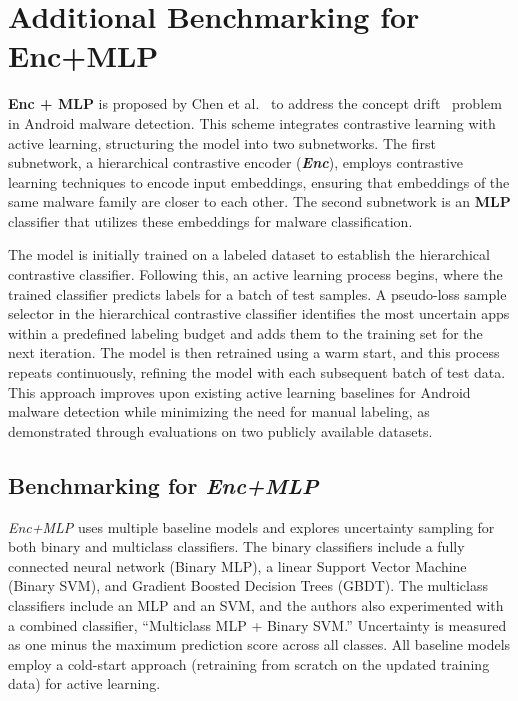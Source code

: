 \section{Additional Benchmarking for Enc+MLP}

\textbf{Enc + MLP} is %
proposed by Chen et al.~\cite{Chen:USENIX23} to address the
concept drift~\cite{Jordaney:USENIX17} problem in Android malware
detection. This scheme integrates contrastive learning with active
learning, structuring the model into two subnetworks. The first
subnetwork, a hierarchical contrastive encoder
(\textbf{\textit{Enc}}), employs contrastive learning techniques to
encode input embeddings, ensuring that embeddings of the same malware
family are closer to each other. The second subnetwork is an
\textbf{MLP} classifier that utilizes these embeddings for malware
classification.

The model is initially trained on a labeled dataset to establish the
hierarchical contrastive classifier. Following this, an active
learning process begins, where the trained classifier predicts labels
for a batch of test samples. A pseudo-loss sample selector in the
hierarchical contrastive classifier identifies the most uncertain apps
within a predefined labeling budget and adds them to the training set
for the next iteration. The model is then retrained using a warm
start, and this process repeats continuously, refining the model with
each subsequent batch of test data. This approach improves upon
existing active learning baselines for Android malware detection while
minimizing the need for manual labeling, as demonstrated through
evaluations on two publicly available datasets.


\subsection{Benchmarking for \textit{Enc+MLP}}

\textit{Enc+MLP} uses multiple baseline models and explores
uncertainty sampling for both binary and multiclass classifiers.  The
binary classifiers include a fully connected neural network (Binary
MLP), a linear Support Vector Machine (Binary SVM), and Gradient
Boosted Decision Trees (GBDT).  The multiclass classifiers include an
MLP and an SVM, and the authors also experimented with a combined
classifier, ``Multiclass MLP + Binary SVM.''  Uncertainty is measured as
one minus the maximum prediction score across all classes.  All
baseline models employ a cold-start approach (retraining from scratch
on the updated training data) for active learning.

